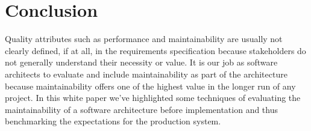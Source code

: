 \documentclass[15pt]{article}
\begin{document}
\section{Conclusion}
Quality attributes such as performance and maintainability are usually not clearly defined, if at all, in the requirements specification because stakeholders do not generally understand their necessity or value. It is our job as software architects to evaluate and include maintainability as part of the architecture because maintainability offers one of the highest value in the longer run of any project. In this white paper we've highlighted some techniques of evaluating the maintainability of a software architecture before implementation and thus benchmarking the expectations for the production system.




\newpage


\end{document}
